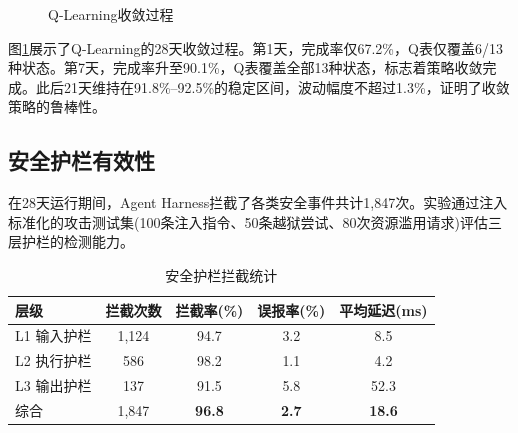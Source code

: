 \documentclass[12pt,a4paper]{ctexart}
\begin{document}
\begin{figure}[H]
\centering
{}
\caption{Q-Learning收敛过程}
\label{fig:convergence}
\end{figure}

图\ref{fig:convergence}展示了Q-Learning的28天收敛过程。第1天，完成率仅67.2\%，Q表仅覆盖6/13种状态。第7天，完成率升至90.1\%，Q表覆盖全部13种状态，标志着策略收敛完成。此后21天维持在91.8\%--92.5\%的稳定区间，波动幅度不超过1.3\%，证明了收敛策略的鲁棒性。

\subsection{安全护栏有效性}

在28天运行期间，Agent Harness拦截了各类安全事件共计1,847次。实验通过注入标准化的攻击测试集(100条注入指令、50条越狱尝试、80次资源滥用请求)评估三层护栏的检测能力。

\begin{table}[H]
\centering
\caption{安全护栏拦截统计}
\label{tab:security}
\begin{tabular}{lcccc}
\toprule
层级 & 拦截次数 & 拦截率(\%) & 误报率(\%) & 平均延迟(ms) \\
\midrule
L1 输入护栏 & 1,124 & 94.7 & 3.2 & 8.5 \\
L2 执行护栏 & 586   & 98.2 & 1.1 & 4.2 \\
L3 输出护栏 & 137   & 91.5 & 5.8 & 52.3 \\
\midrule
综合 & 1,847 & {\bf 96.8} & {\bf 2.7} & {\bf 18.6} \\
\bottomrule
\end{tabular}
\end{table}
\end{document}
